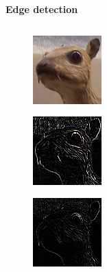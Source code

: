 \documentclass[xcolor=dvipsnames]{beamer}
\begin{document}
\begin{frame}{\bf Edge detection}

\begin{columns}
\begin{column}{0.5\textwidth}

  \begin{figure}[!htb]
    \centering
    \includegraphics[scale=1.1]{../../pictures/image_processing/orig.png}
  \end{figure}

  \begin{figure}[!htb]
    \centering
    \includegraphics[scale=1.1]{../../pictures/image_processing/edges.png}
  \end{figure}

  \begin{figure}[!htb]
    \centering
    \includegraphics[scale=1.1]{../../pictures/image_processing/edges2.png}
  \end{figure}

\end{column}
\begin{column}{0.5\textwidth}  %


\end{column}
\end{columns}
\end{frame}
\end{document}

